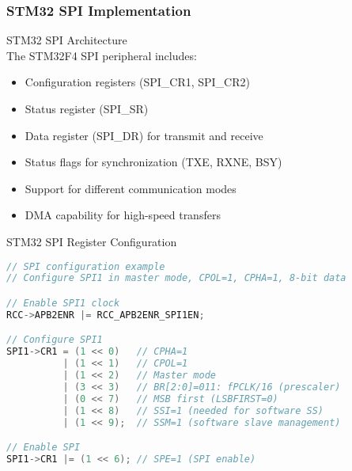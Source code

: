 \subsubsection{STM32 SPI Implementation}

\begin{concept}{STM32 SPI Architecture}\\
The STM32F4 SPI peripheral includes:
\begin{itemize}
    \item Configuration registers (SPI\_CR1, SPI\_CR2)
    \item Status register (SPI\_SR)
    \item Data register (SPI\_DR) for transmit and receive
    \item Status flags for synchronization (TXE, RXNE, BSY)
    \item Support for different communication modes
    \item DMA capability for high-speed transfers
\end{itemize}
\end{concept}

\multend

\begin{code}{STM32 SPI Register Configuration}
\begin{lstlisting}[language=C, style=basesmol]
// SPI configuration example
// Configure SPI1 in master mode, CPOL=1, CPHA=1, 8-bit data

// Enable SPI1 clock
RCC->APB2ENR |= RCC_APB2ENR_SPI1EN;

// Configure SPI1
SPI1->CR1 = (1 << 0)   // CPHA=1
          | (1 << 1)   // CPOL=1
          | (1 << 2)   // Master mode
          | (3 << 3)   // BR[2:0]=011: fPCLK/16 (prescaler)
          | (0 << 7)   // MSB first (LSBFIRST=0)
          | (1 << 8)   // SSI=1 (needed for software SS)
          | (1 << 9);  // SSM=1 (software slave management)

// Enable SPI
SPI1->CR1 |= (1 << 6); // SPE=1 (SPI enable)
\end{lstlisting}
\end{code}

